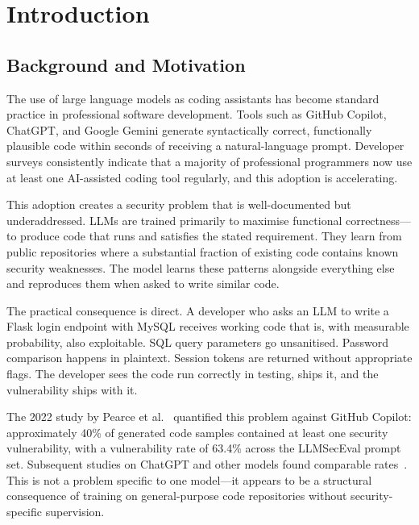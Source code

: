 \documentclass[12pt,a4paper]{report}
\begin{document}
\chapter{Introduction}
\label{ch:introduction}

\section{Background and Motivation}
\label{sec:background}

The use of large language models as coding assistants has become standard practice
in professional software development. Tools such as GitHub Copilot, ChatGPT, and
Google Gemini generate syntactically correct, functionally plausible code within
seconds of receiving a natural-language prompt. Developer surveys consistently
indicate that a majority of professional programmers now use at least one
AI-assisted coding tool regularly, and this adoption is accelerating.

This adoption creates a security problem that is well-documented but underaddressed.
LLMs are trained primarily to maximise functional correctness---to produce code
that runs and satisfies the stated requirement. They learn from public repositories
where a substantial fraction of existing code contains known security weaknesses.
The model learns these patterns alongside everything else and reproduces them when
asked to write similar code.

The practical consequence is direct. A developer who asks an LLM to write a Flask
login endpoint with MySQL receives working code that is, with measurable probability,
also exploitable. SQL query parameters go unsanitised. Password comparison happens
in plaintext. Session tokens are returned without appropriate flags. The developer
sees the code run correctly in testing, ships it, and the vulnerability ships with it.

The 2022 study by Pearce et al.~\cite{pearce2022asleep} quantified this problem
against GitHub Copilot: approximately 40\% of generated code samples contained at
least one security vulnerability, with a vulnerability rate of 63.4\% across the
LLMSecEval prompt set. Subsequent studies on ChatGPT and other models found
comparable rates~\cite{khoury2023secure,tony2023llmseceval}. This is not a problem
specific to one model---it appears to be a structural consequence of training on
general-purpose code repositories without security-specific supervision.
\end{document}
